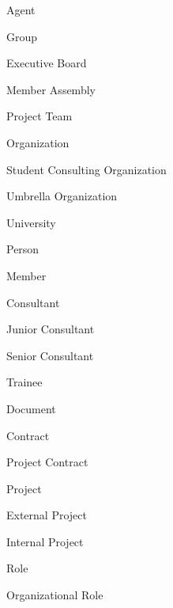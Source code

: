 \documentclass[a4paper, DIV=13, BCOR=0cm]{scrbook}
\begin{document}
\begin{multicols}{2}
	\begin{compactitem}
		\item Agent
		\begin{compactitem}
			\item Group
			\begin{compactitem}
				\item Executive Board
				\item Member Assembly
				\item Project Team
			\end{compactitem}
			\item Organization
			\begin{compactitem}
				\item Student Consulting Organization
				\item Umbrella Organization
				\item University
			\end{compactitem}
			\item Person
			\begin{compactitem}
				\item Member
				\begin{compactitem}
					\item Consultant
					\item Junior Consultant
					\item Senior Consultant
					\item Trainee
				\end{compactitem}
			\end{compactitem}
		\end{compactitem}
		\item Document
		\begin{compactitem}
			\item Contract
			\begin{compactitem}
				\item Project Contract
			\end{compactitem}
		\end{compactitem}
		\item Project
		\begin{compactitem}
			\item External Project
			\item Internal Project
		\end{compactitem}
		\item Role
		\begin{compactitem}
			\item Organizational Role

\end{compactitem}
\end{compactitem}
\end{multicols}
\end{document}
